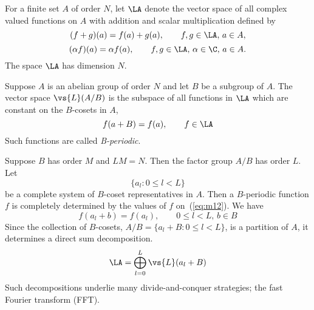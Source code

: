 For a finite set $A$ of order $N$, let $\LA$ denote the vector space of all
complex valued functions on $A$ with addition and scalar multiplication
defined by 
\[
(f+g)(a) = f(a)+g(a), \qquad f, g \in \LA,\, a\in A,
\]
\[
(\alpha f)(a) = \alpha f(a), \qquad f, g \in \LA, \, \alpha \in \C, \, a\in A.
\]
The space $\LA$ has dimension $N$.

Suppose $A$ is an abelian group of order $N$ and let $B$ be a subgroup of
$A$.  The vector space $\vs{L}(A/B)$ is the subspace of all functions in $\LA$
which are constant on the $B$-cosets in $A$,
\[
f(a+B) = f(a), \qquad f\in \LA
\]
Such functions are called \emph{B-periodic}. 

Suppose $B$ has order $M$ and $LM = N$.  Then the factor group $A/B$ has
order $L$.  Let
\begin{equation}\label{eq:m12}
\{a_l : 0 \leq l < L\}
\end{equation}
be a complete system of $B$-coset representatives in $A$. Then a $B$-periodic
function $f$ is completely determined by the values of $f$ on~(\ref{eq:m12}).
We have 
\[
f(a_l + b) = f(a_l), \qquad 0 \leq l < L, \, b\in B
\]
Since the collection of $B$-cosets, $A/B =\{a_l +B : 0 \leq l < L\}$, is a partition of $A$,
it determines a direct sum decomposition.
\[
\LA = \bigoplus_{l = 0}^L \vs{L}(a_l + B)
\]
Such decompositions underlie many divide-and-conquer strategies; \eg the fast
Fourier transform (FFT).

